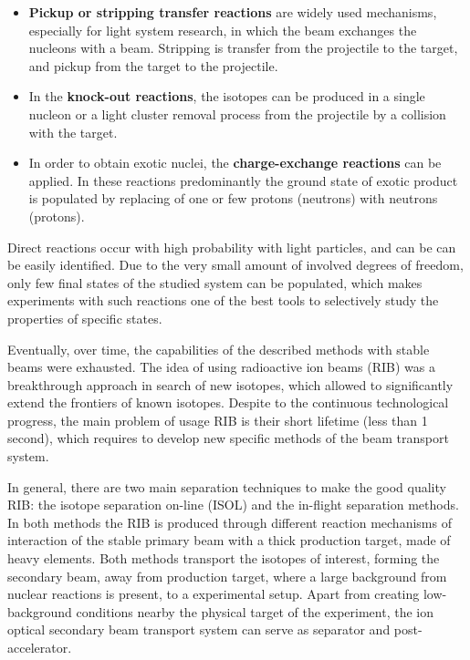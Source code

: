 \begin{itemize}
	
	\item 
	\textbf{Pickup or stripping transfer reactions} are widely used mechanisms, especially for light system research, in which the beam exchanges the nucleons with a beam. 
	Stripping is transfer from the projectile to the target, and pickup from the target to the projectile.
	
	\item
	In the \textbf{knock-out reactions}, the isotopes can be produced in a single nucleon or a light cluster removal process from the projectile by a collision with the target.
	
	\item
	In order to obtain exotic nuclei, the \textbf{charge-exchange reactions} can be applied.
	In these reactions predominantly  the ground state of exotic product is populated by replacing of one or few protons (neutrons) with neutrons (protons).
	
	
\end{itemize}	
Direct reactions occur with high probability with light particles, and can be can be easily identified.
Due to the very small amount of involved degrees of freedom, only few final states of the studied system can be populated, which makes experiments with such reactions one of the best tools to selectively study the properties of specific states.

Eventually, over time, the capabilities of the described methods with stable beams were exhausted.
The idea of using radioactive ion beams (RIB) was a breakthrough approach in search of new isotopes, which allowed to significantly extend the frontiers of known isotopes. 
Despite to the continuous technological progress, the main problem of usage RIB is their short lifetime (less than 1 second), which requires to develop new specific methods of the beam transport system.


In general, there are two main separation techniques to make the good quality RIB: the isotope separation on-line (ISOL) and the in-flight separation methods.
In both methods the RIB is produced through different reaction mechanisms of interaction of the stable primary beam with a thick production target, made of heavy elements.
Both methods transport the isotopes of interest, forming the secondary beam, away from production target, where a large background from nuclear reactions is present, to a experimental setup.
Apart from creating low-background conditions nearby the physical target of the experiment, the ion optical secondary beam transport system can serve as separator and post-accelerator.

